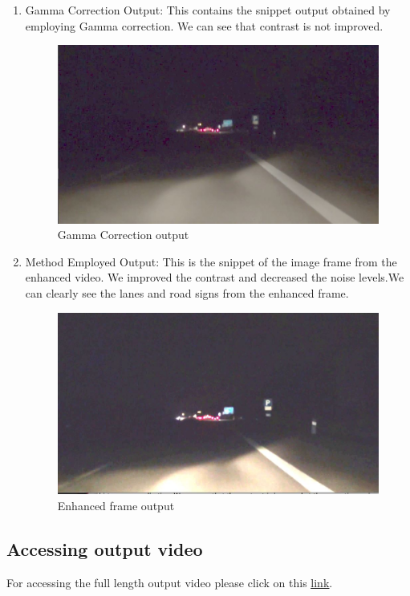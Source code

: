 \documentclass[12pt]{article}
\begin{document}
\begin{enumerate}
\newpage
\item Gamma Correction Output: This contains the snippet output obtained by employing Gamma correction. We can see that contrast is not improved.

\begin{figure}[h]
    \centering
    \includegraphics[width=14cm]{gammavideo}
    \caption{Gamma Correction output}
    \label{fig:gammavideo}
\end{figure}

\item Method Employed Output: This is the snippet of the image frame from the enhanced video. We improved the contrast and decreased the noise levels.We can clearly see the lanes and road signs from the enhanced frame.
\begin{figure}[h]
    \centering
    \includegraphics[width=14cm]{enhancedvideosnippet}
    \caption{Enhanced frame output}
    \label{fig:enhancedvideosnippet}
\end{figure}
\end{enumerate}

\subsection{Accessing output video} 
For accessing the full length output video please click on this \href{https://drive.google.com/drive/folders/1f6jBcJo96DZhwxBkdezf6MwAXwktGqS-?usp=sharing}{\underline{link}}.
\end{document}
